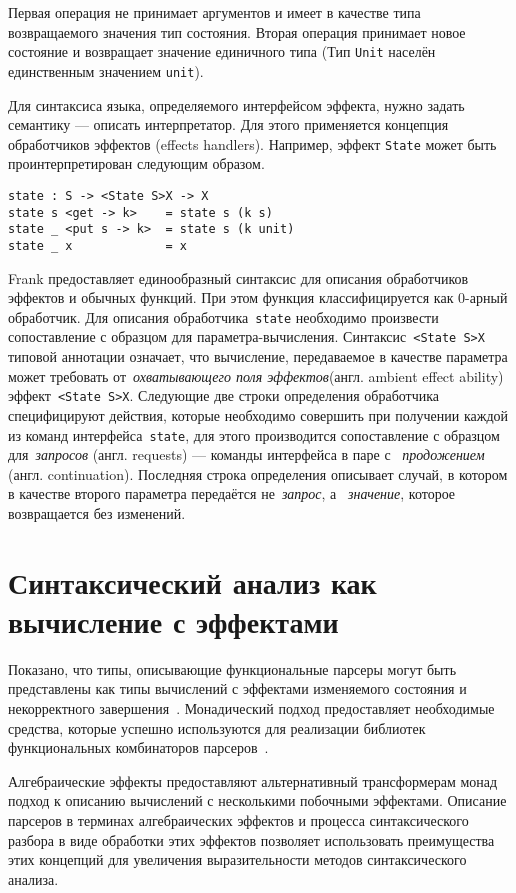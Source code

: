 \documentclass [a4paper] {article}
\begin{document}
Первая операция не принимает аргументов и имеет в качестве типа возвращаемого
значения тип состояния. Вторая операция принимает новое состояние и возвращает
значение единичного типа (Тип \texttt{Unit} населён единственным значением
\texttt{unit}).

Для синтаксиса языка, определяемого интерфейсом эффекта, нужно задать 
семантику --- описать интерпретатор. Для этого применяется концепция
обработчиков эффектов  (effects handlers). Например, эффект \texttt{State}
может быть проинтерпретирован следующим образом.

\begin{verbatim}
state : S -> <State S>X -> X
state s <get -> k>    = state s (k s)
state _ <put s -> k>  = state s (k unit)
state _ x             = x
\end{verbatim}

Frank предоставляет единообразный синтаксис для описания обработчиков эффектов
и обычных функций. При этом функция классифицируется как 0-арный обработчик.
Для описания обработчика~\texttt{state} необходимо произвести сопоставление с
образцом для параметра-вычисления. Синтаксис~\texttt{<State S>X} типовой
аннотации означает, что вычисление, передаваемое в качестве параметра может
требовать от~\emph{охватывающего поля эффектов}(англ. ambient effect ability)
эффект~\texttt{<State S>X}. Следующие две строки определения обработчика
специфицируют действия, которые необходимо совершить при получении каждой из
команд интерфейса~\texttt{state}, для этого производится сопоставление с
образцом для~\emph{запросов} (англ. requests) --- команды интерфейса в паре с
~\emph{продожением} (англ. continuation). Последняя строка определения описывает
случай, в котором в качестве второго параметра передаётся не~\emph{запрос}, а
~\emph{значение}, которое возвращается без изменений.

\section{Синтаксический анализ как вычисление с эффектами}

Показано, что типы, описывающие функциональные парсеры могут быть представлены
как типы вычислений с эффектами изменяемого состояния и некорректного
завершения~\cite{monParsing}. Монадический подход предоставляет
необходимые средства, которые успешно используются для реализации библиотек
функциональных комбинаторов парсеров~\cite{parsec}.

Алгебраические эффекты предоставляют альтернативный трансформерам монад подход к
описанию вычислений с несколькими побочными эффектами. Описание парсеров в
терминах алгебраических эффектов и процесса синтаксического разбора в виде
обработки этих эффектов позволяет использовать преимущества этих концепций
для увеличения выразительности методов синтаксического анализа.
\end{document}
